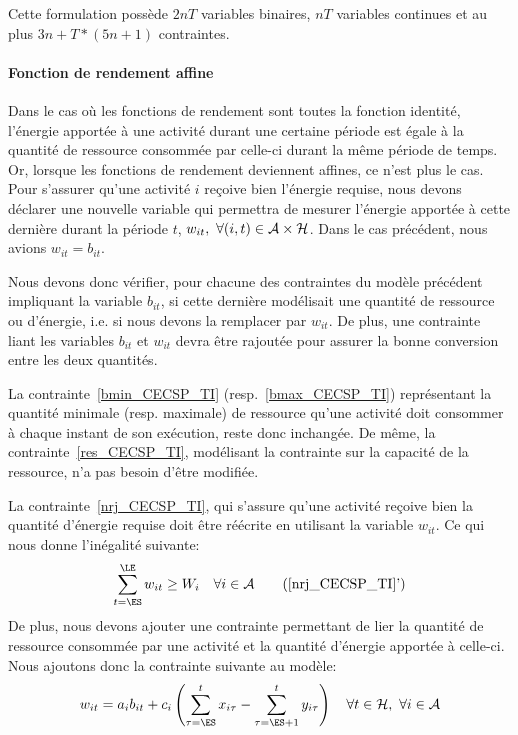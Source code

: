 Cette formulation possède $2nT$ variables binaires, $nT$ variables
continues et au plus $3n+T*(5n+1)$ contraintes.

\paragraph{Fonction de rendement affine}

Dans le cas où les fonctions de rendement sont toutes la fonction
identité, l'énergie apportée à une activité durant une certaine
période est égale à la quantité de ressource consommée par celle-ci
durant la même période de temps. Or, lorsque les fonctions de
rendement deviennent affines, ce n'est plus le cas.  Pour s'assurer
qu'une activité $i$ reçoive bien l'énergie requise, nous devons
déclarer une nouvelle variable qui permettra de mesurer l'énergie
apportée à cette dernière durant la période $t$, $w_{it},\ \forall
(i,t) \in {\cal A} \times {\cal H}$. Dans le cas
précédent, nous avions $w_{it}=b_{it}$.

Nous devons donc vérifier, pour chacune des contraintes du modèle
précédent impliquant la variable $b_{it}$, si cette dernière
modélisait une quantité de ressource ou d'énergie, i.e. si nous devons
la remplacer par $w_{it}$. De plus, une contrainte liant les variables
$b_{it}$ et $w_{it}$ devra être rajoutée pour assurer la bonne
conversion entre les deux quantités.

La contrainte~\eqref{bmin_CECSP_TI} (resp.~\eqref{bmax_CECSP_TI})
représentant la quantité minimale (resp. maximale) de ressource qu'une
activité doit consommer à chaque instant de son exécution, reste donc
inchangée. De même, la contrainte~\eqref{res_CECSP_TI}, modélisant la
contrainte sur la capacité de la ressource, n'a pas besoin d’être
modifiée.

La contrainte~\eqref{nrj_CECSP_TI}, qui s'assure qu'une activité
reçoive bien la quantité d'énergie requise doit être réécrite en
utilisant la variable $w_{it}$. Ce qui nous donne l'inégalité
suivante:
\begin{equation} 
\sum_{t=\ES}^{\LE} w_{it} \ge W_i\quad \forall i \in \A \tag{\ref{nrj_CECSP_TI}'} \label{nrj2_CECSP_TI}
\end{equation} 
De plus, nous devons ajouter une contrainte permettant de lier la
quantité de ressource consommée par une activité et la quantité
d'énergie apportée à celle-ci. Nous ajoutons donc la contrainte
suivante au modèle:
\begin{equation}
w_{it}=a_ib_{it}+c_i\left(\sum_{\tau=\ES}^t
x_{i\tau}-\sum_{\tau=\ES+1}^t y_{i\tau}\right) \quad \forall t\in
\H,\ \forall i \in \A \label{conv_CECSP_TI}
\end{equation} 


